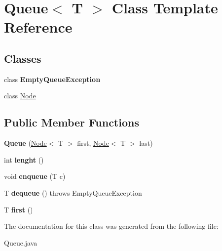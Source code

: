 \hypertarget{class_queue}{}\section{Queue$<$ T $>$ Class Template Reference}
\label{class_queue}
\subsection*{Classes}
\begin{DoxyCompactItemize}
\item 
class {\bfseries Empty\+Queue\+Exception}
\item 
class \hyperlink{class_queue_1_1_node}{Node}
\end{DoxyCompactItemize}
\subsection*{Public Member Functions}
\begin{DoxyCompactItemize}
\item 
\hypertarget{class_queue_abd70bf7d8a59511c940c8d21070d4a4a}{}{\bfseries Queue} (\hyperlink{class_queue_1_1_node}{Node}$<$ T $>$ first, \hyperlink{class_queue_1_1_node}{Node}$<$ T $>$ last)\label{class_queue_abd70bf7d8a59511c940c8d21070d4a4a}

\item 
\hypertarget{class_queue_a24be9454f58755ab6c06b3d56240c511}{}int {\bfseries lenght} ()\label{class_queue_a24be9454f58755ab6c06b3d56240c511}

\item 
\hypertarget{class_queue_ac07fc6a5804dc4f88ebf20137fd9c211}{}void {\bfseries enqueue} (T c)\label{class_queue_ac07fc6a5804dc4f88ebf20137fd9c211}

\item 
\hypertarget{class_queue_ab0a5fea3874ef770870b3fcb09c3d156}{}T {\bfseries dequeue} ()  throws Empty\+Queue\+Exception \label{class_queue_ab0a5fea3874ef770870b3fcb09c3d156}

\item 
\hypertarget{class_queue_a3640b0362f3fb7f676b915bbce077ea1}{}T {\bfseries first} ()\label{class_queue_a3640b0362f3fb7f676b915bbce077ea1}

\end{DoxyCompactItemize}


The documentation for this class was generated from the following file\+:\begin{DoxyCompactItemize}
\item 
Queue.\+java\end{DoxyCompactItemize}
